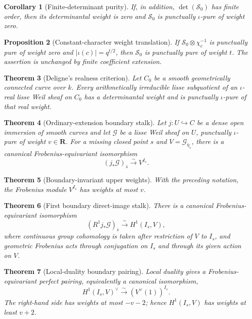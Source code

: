 \documentclass[10pt]{article}
\newtheorem{theorem}{Theorem}[section]
\newtheorem{proposition}[theorem]{Proposition}
\newtheorem{corollary}[theorem]{Corollary}
\theoremstyle{definition}
\begin{document}
\begin{corollary}[Finite-determinant purity]
If, in addition, \(\det(\mathcal S_0)\) has finite order, then its
determinantal weight is zero and \(\mathcal S_0\) is punctually
\(\iota\)-pure of weight zero.
\end{corollary}

\begin{proposition}[Constant-character weight translation]
If \(\mathcal S_0\otimes\chi_c^{-1}\) is punctually pure of weight zero and
\(|\iota(c)|=q^{t/2}\), then \(\mathcal S_0\) is punctually pure of weight
\(t\).  The assertion is unchanged by finite coefficient extension.
\end{proposition}

\begin{theorem}[Deligne's realness criterion]
Let \(C_0\) be a smooth geometrically connected curve over \(k\).  Every
arithmetically irreducible lisse subquotient of an \(\iota\)-real lisse Weil
sheaf on \(C_0\) has a determinantal weight and is punctually
\(\iota\)-pure of that real weight.
\end{theorem}

\begin{theorem}[Ordinary-extension boundary stalk]
Let \(j:U\hookrightarrow C\) be a dense open immersion of smooth curves and
let \(\mathcal G\) be a lisse Weil sheaf on \(U\), punctually
\(\iota\)-pure of weight \(v\in\mathbf R\).  For a missing closed point
\(s\) and \(V=\mathcal G_{\bar\eta_s}\), there is a canonical
Frobenius-equivariant isomorphism
\[
 (j_*\mathcal G)_{\bar s}\xrightarrow{\sim}V^{I_s}.
\]
\end{theorem}

\begin{theorem}[Boundary-invariant upper weights]
With the preceding notation, the Frobenius module \(V^{I_s}\) has weights
at most \(v\).
\end{theorem}

\begin{theorem}[First boundary direct-image stalk]
There is a canonical Frobenius-equivariant isomorphism
\[
 (R^1j_*\mathcal G)_{\bar s}\xrightarrow{\sim}H^1(I_s,V),
\]
where continuous group cohomology is taken after restriction of \(V\) to
\(I_s\), and geometric Frobenius acts through conjugation on \(I_s\) and
through its given action on \(V\).
\end{theorem}

\begin{theorem}[Local-duality boundary pairing]
Local duality gives a Frobenius-equivariant perfect pairing, equivalently a
canonical isomorphism,
\[
 H^1(I_s,V)^\vee\xrightarrow{\sim}(V^\vee(1))^{I_s}.
\]
The right-hand side has weights at most \(-v-2\); hence
\(H^1(I_s,V)\) has weights at least \(v+2\).
\end{theorem}
\end{document}
